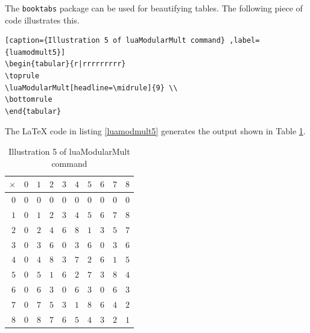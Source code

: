 ﻿\documentclass{article}
\begin{document}
The \verb|booktabs| package can be used for beautifying tables. The following piece of code illustrates this.
\begin{lstlisting}[caption={Illustration 5 of luaModularMult command} ,label={luamodmult5}]
\begin{tabular}{r|rrrrrrrrr}
\toprule
\luaModularMult[headline=\midrule]{9} \\
\bottomrule
\end{tabular}
\end{lstlisting}
The LaTeX code in listing \ref{luamodmult5} generates the output shown in Table  \ref{luamodmult5tbl}.
\begin{table}[H]
\centering
\begin{tabular}{r|rrrrrrrrr}
\toprule
$\times$ & $0$ & $1$ & $2$ & $3$ & $4$ & $5$ & $6$ & $7$ & $8$\\ \midrule $0$ & $0$ & $0$ & $0$ & $0$ & $0$ & $0$ & $0$ & $0$ & $0$\\ $1$ & $0$ & $1$ & $2$ & $3$ & $4$ & $5$ & $6$ & $7$ & $8$\\ $2$ & $0$ & $2$ & $4$ & $6$ & $8$ & $1$ & $3$ & $5$ & $7$\\ $3$ & $0$ & $3$ & $6$ & $0$ & $3$ & $6$ & $0$ & $3$ & $6$\\ $4$ & $0$ & $4$ & $8$ & $3$ & $7$ & $2$ & $6$ & $1$ & $5$\\ $5$ & $0$ & $5$ & $1$ & $6$ & $2$ & $7$ & $3$ & $8$ & $4$\\ $6$ & $0$ & $6$ & $3$ & $0$ & $6$ & $3$ & $0$ & $6$ & $3$\\ $7$ & $0$ & $7$ & $5$ & $3$ & $1$ & $8$ & $6$ & $4$ & $2$\\ $8$ & $0$ & $8$ & $7$ & $6$ & $5$ & $4$ & $3$ & $2$ & $1$ \\
\bottomrule
\end{tabular} 
\caption{Illustration 5 of luaModularMult command}
\label{luamodmult5tbl}
\end{table}
\end{document}
